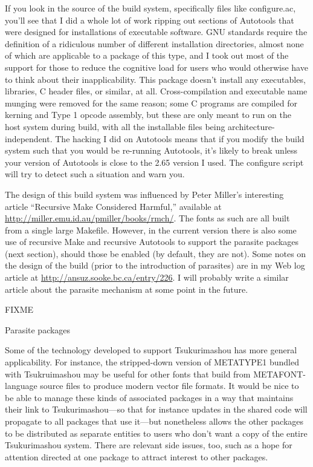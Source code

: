 \documentclass[14pt]{extarticle}
\newcommand{\blsubsection}[2]{%
\kaku\large#1\qquad\phantomsection%
\addcontentsline{toc}{subsection}{#1 #2}%
#2\par\addpenalty{-300}\normalsize}
\begin{document}
If you look in the source of the build system, specifically files like
configure.ac, you'll see that I did a whole lot of work ripping out sections
of Autotools that were designed for installations of executable software. 
GNU standards require the definition of a ridiculous number of different
installation directories, almost none of which are applicable to a package
of this type, and I took out most of the support for those to reduce the
cognitive load for users who would otherwise have to think about their
inapplicability.  This package doesn't install any executables, libraries, C
header files, or similar, at all.  Cross-compilation and executable name
munging were removed for the same reason; some C programs are compiled for
kerning and Type 1 opcode assembly, but these are only meant to run on the
host system during build, with all the installable files being
architecture-independent.  The hacking I did on Autotools means that if you
modify the build system such that you would be re-running Autotools, it's
likely to break unless your version of Autotools is close to the 2.65
version I used.  The configure script will try to detect such a situation
and warn you.

The design of this build system was influenced by Peter Miller's interesting
article ``Recursive Make Considered Harmful,'' available at
\url{http://miller.emu.id.au/pmiller/books/rmch/}.  The fonts as such are
all built from a single large Makefile.  However, in the current version
there is also some use of recursive Make and recursive Autotools to support
the parasite packages (next section), should those be enabled (by default,
they are not).  Some notes on the design of the build (prior to the
introduction of parasites) are in my Web log article at
\url{http://ansuz.sooke.bc.ca/entry/226}.  I will probably write a similar
article about the parasite mechanism at some point in the future.


\blsubsection{FIXME}{Parasite packages}

Some of the technology developed to support Tsukurimashou has more general
applicability.  For instance, the stripped-down version of METATYPE1 bundled
with Tsukruimashou may be useful for other fonts that build from
METAFONT-language source files to produce modern vector file formats.  It
would be nice to be able to manage these kinds of associated packages in a
way that maintains their link to Tsukurimashou---so that for instance
updates in the shared code will propagate to all packages that use it---but
nonetheless allows the other packages to be distributed as separate entities
to users who don't want a copy of the entire Tsukurimashou system.  There
are relevant side issues, too, such as a hope for attention directed at one
package to attract interest to other packages.
\end{document}
